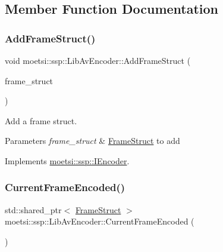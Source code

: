 \subsection{Member Function Documentation}
\mbox{\label{classmoetsi_1_1ssp_1_1LibAvEncoder_a931327f154e0da63fdfed73cf317d688}} 
\subsubsection{\texorpdfstring{Add\+Frame\+Struct()}{AddFrameStruct()}}
{\footnotesize\ttfamily void moetsi\+::ssp\+::\+Lib\+Av\+Encoder\+::\+Add\+Frame\+Struct (\begin{DoxyParamCaption}\item[{std\+::shared\+\_\+ptr$<$ \hyperlink{structmoetsi_1_1ssp_1_1FrameStruct}{Frame\+Struct} $>$ \&}]{frame\+\_\+struct }\end{DoxyParamCaption})\hspace{0.3cm}{\ttfamily [virtual]}}



Add a frame struct. 


\begin{DoxyParams}{Parameters}
{\em frame\+\_\+struct} & \hyperlink{structmoetsi_1_1ssp_1_1FrameStruct}{Frame\+Struct} to add \\
\hline
\end{DoxyParams}


Implements \hyperlink{classmoetsi_1_1ssp_1_1IEncoder_a8c223ec82fdd30ee8ee75157306054ec}{moetsi\+::ssp\+::\+I\+Encoder}.

\mbox{\label{classmoetsi_1_1ssp_1_1LibAvEncoder_aedb37703d73b55f1389a122d2ecbe923}} 
\subsubsection{\texorpdfstring{Current\+Frame\+Encoded()}{CurrentFrameEncoded()}}
{\footnotesize\ttfamily std\+::shared\+\_\+ptr$<$ \hyperlink{structmoetsi_1_1ssp_1_1FrameStruct}{Frame\+Struct} $>$ moetsi\+::ssp\+::\+Lib\+Av\+Encoder\+::\+Current\+Frame\+Encoded (\begin{DoxyParamCaption}{ }\end{DoxyParamCaption})\hspace{0.3cm}{\ttfamily [virtual]}}



